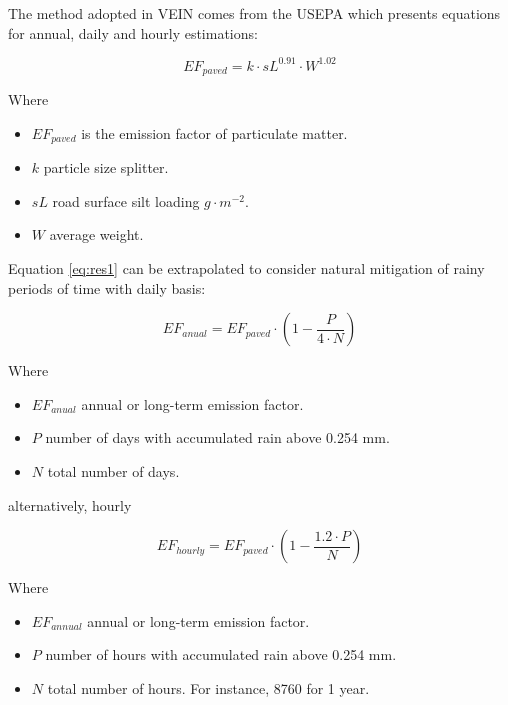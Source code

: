 \documentclass[12pt,graybox,envcountchap,sectrefs]{krantz}
\providecommand{\tightlist}{%
  \setlength{\itemsep}{0pt}\setlength{\parskip}{0pt}}
\theoremstyle{definition}
\theoremstyle{definition}
\theoremstyle{definition}
\theoremstyle{remark}
\begin{document}
The method adopted in VEIN comes from the USEPA \citep{paved} which
presents equations for annual, daily and hourly estimations:

\begin{equation}
EF_{paved}=k \cdot sL^{0.91} \cdot W^{1.02}
\label{eq:res1}
\end{equation}

Where

\begin{itemize}
\tightlist
\item
  \(EF_{paved}\) is the emission factor of particulate matter.
\item
  \(k\) particle size splitter.
\item
  \(sL\) road surface silt loading \(g \cdot m^{-2}\).
\item
  \(W\) average weight.
\end{itemize}

Equation \eqref{eq:res1} can be extrapolated to consider natural
mitigation of rainy periods of time with daily basis:

\begin{equation}
EF_{anual} = EF_{paved} \cdot (1 - \frac{P}{4 \cdot N})
\label{eq:res2}
\end{equation}

Where

\begin{itemize}
\tightlist
\item
  \(EF_{anual}\) annual or long-term emission factor.
\item
  \(P\) number of days with accumulated rain above 0.254 mm.
\item
  \(N\) total number of days.
\end{itemize}

alternatively, hourly

\begin{equation}
EF_{hourly} = EF_{paved} \cdot (1 - \frac{1.2 \cdot P}{N})
\label{eq:res2}
\end{equation}

Where

\begin{itemize}
\tightlist
\item
  \(EF_{annual}\) annual or long-term emission factor.
\item
  \(P\) number of hours with accumulated rain above 0.254 mm.
\item
  \(N\) total number of hours. For instance, 8760 for 1 year.
\end{itemize}
\end{document}
